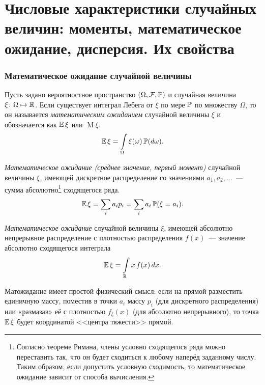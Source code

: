 \section{Числовые характеристики случайных величин: моменты, математическое ожидание, дисперсия. Их свойства}

\subsubsection{Математическое ожидание случайной величины}

\begin{defn}
    Пусть задано вероятностное пространство $(\Omega, \mathcal{F}, \operatorname{\mathbb{P}})$ и случайная величина $\xi \colon \Omega \mapsto \mathbb{R}$. 
    Если существует интеграл Лебега от $\xi$ по мере $\operatorname{\mathbb{P}}$ по множеству $\Omega$, то он называется \textit{математическим ожиданием} случайной величины $\xi$ и обозначается как $\operatorname{\mathbb{E}} \xi$ или $\operatorname{M} \! \xi$.
    \begin{equation*}
        \operatorname{\mathbb{E}} \xi = \int\limits_{\Omega} \xi(\omega) \operatorname{\mathbb{P}}(d\omega).
    \end{equation*}
\end{defn}

\begin{defn}
    \textit{Математическое ожидание (среднее значение, первый момент)} случайной величины $\xi$, 
    имеющей дискретное распределение со значениями $a_1, a_2, \ldots$~--- сумма абсолютно\footnote{Согласно теореме Римана, члены условно сходящегося ряда можно переставить так, что он будет сходиться к любому наперёд заданному числу. 
        Таким образом, если допустить условную сходимость, то математическое ожидание зависит от способа вычисления.} 
    сходящегося ряда.
    \begin{equation*}
        \operatorname{\mathbb{E}} \xi=\sum\limits_{i} a_{i} p_{i}=\sum\limits_{i} a_{i} \operatorname{\mathbb{P}}(\xi=a_{i}).
    \end{equation*}
\end{defn}

\begin{defn}
    \textit{Математическое ожидание} случайной величины $\xi$, имеющей абсолютно непрерывное распределение с плотностью распределения $f(x)$~--- значение абсолютно сходящегося интеграла
    \begin{equation*}
        \operatorname{\mathbb{E}} \xi=\int\limits_{\mathbb{R}} x \, f(x) \, dx.
    \end{equation*}
\end{defn}

Матожидание имеет простой физический смысл: если на прямой разместить единичную массу, поместив в точки $a_i$ массу $p_i$ (для дискретного распределения) или «размазав» её с плотностью $f_\xi(x)$ (для абсолютно непрерывного), то точка $\operatorname{\mathbb{E}} \xi$ будет координатой <<центра тяжести>> прямой.

